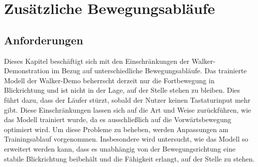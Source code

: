 \section{Zusätzliche Bewegungsabläufe}
\subsection{Anforderungen}
Dieses Kapitel beschäftigt sich mit den Einschränkungen der Walker-Demonstration im Bezug auf unterschiedliche Bewegungsabläufe. Das trainierte Modell der Walker-Demo beherrscht derzeit nur die Fortbewegung in Blickrichtung und ist nicht in der Lage, auf der Stelle stehen zu bleiben. Dies führt dazu, dass der Läufer stürzt, sobald der Nutzer keinen Tastaturinput mehr gibt. Diese Einschränkungen lassen sich auf die Art und Weise zurückführen, wie das Modell trainiert wurde, da es ausschließlich auf die Vorwärtsbewegung optimiert wird. Um diese Probleme zu beheben, werden Anpassungen am Trainingsablauf vorgenommen. Insbesondere wird untersucht, wie das Modell so erweitert werden kann, dass es unabhängig von der Bewegungsrichtung eine stabile Blickrichtung beibehält und die Fähigkeit erlangt, auf der Stelle zu stehen.


